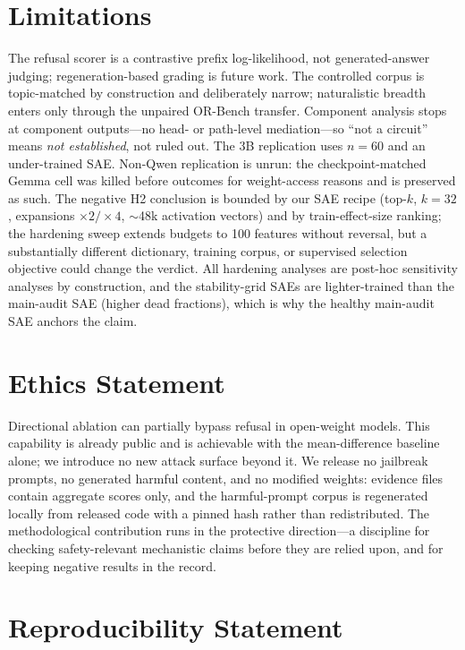 \documentclass[11pt]{article}
\begin{document}
\section*{Limitations}

The refusal scorer is a contrastive prefix log-likelihood, not
generated-answer judging; regeneration-based grading is future work.  The
controlled corpus is topic-matched by construction and deliberately narrow;
naturalistic breadth enters only through the unpaired OR-Bench transfer.
Component analysis stops at component outputs---no head- or path-level
mediation---so ``not a circuit'' means \emph{not established}, not ruled out.
The 3B replication uses $n=60$ and an under-trained SAE.  Non-Qwen
replication is unrun: the checkpoint-matched Gemma cell was killed before
outcomes for weight-access reasons and is preserved as such.  The negative H2
conclusion is bounded by our SAE recipe (top-$k$, $k=32$, expansions
$\times2/\times4$, $\sim$48k activation vectors) and by train-effect-size
ranking; the hardening sweep extends budgets to 100 features without
reversal, but a substantially different dictionary, training corpus, or
supervised selection objective could change the verdict.  All hardening
analyses are post-hoc sensitivity analyses by construction, and the
stability-grid SAEs are lighter-trained than the main-audit SAE (higher dead
fractions), which is why the healthy main-audit SAE anchors the claim.

\section*{Ethics Statement}

Directional ablation can partially bypass refusal in open-weight models.
This capability is already public \citep{arditi2024refusal} and is achievable
with the mean-difference baseline alone; we introduce no new attack surface
beyond it.  We release no jailbreak prompts, no generated harmful content,
and no modified weights: evidence files contain aggregate scores only, and
the harmful-prompt corpus is regenerated locally from released code with a
pinned hash rather than redistributed.  The methodological contribution runs
in the protective direction---a discipline for checking safety-relevant
mechanistic claims before they are relied upon, and for keeping negative
results in the record.



\appendix

\section*{Reproducibility Statement}
\end{document}
